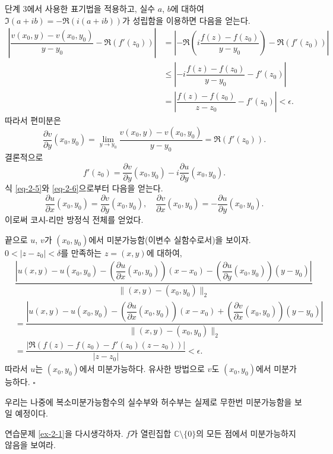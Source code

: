 단계 3에서 사용한 표기법을 적용하고,
실수 $a$, $b$에 대하여
$\Im(a+ib) = -\Re(i(a+ib))$가 성립함을 이용하면 다음을 얻는다.
\begin{align*}
\left| \dfrac{v(x_0,y) - v(x_0, y_0)}{y-y_0} - \Re(f'(z_0)) \right| 
&= \left| -\Re\left( i\dfrac{f(z)-f(z_0)}{y-y_0}\right) - \Re(f'(z_0)) \right| \\
&\le \left| -i\dfrac{f(z)-f(z_0)}{y-y_0} - f'(z_0) \right| \\
&= \left| \dfrac{f(z)-f(z_0)}{z-z_0} - f'(z_0) \right| < \epsilon .
\end{align*}
따라서 편미분은
$$
\dfrac{\partial v}{\partial y}(x_0, y_0) 
= \lim\limits_{y\to y_0} \dfrac{v(x_0,y) - v(x_0, y_0)}{y-y_0} 
= \Re(f'(z_0)).
$$
결론적으로
\begin{equation}\label{eq-2-6}
f'(z_0) = \dfrac{\partial v}{\partial y}(x_0, y_0) 
- i \dfrac{\partial u}{\partial y}(x_0, y_0).
\end{equation}
식 \eqref{eq-2-5}와 \eqref{eq-2-6}으로부터 다음을 얻는다.
$$
\dfrac{\partial u}{\partial x}(x_0, y_0) = \dfrac{\partial v}{\partial y}(x_0, y_0),
\quad
\dfrac{\partial v}{\partial x}(x_0, y_0) = - \dfrac{\partial u}{\partial y}(x_0, y_0).
$$
이로써 코시-리만 방정식 전체를 얻었다.

끝으로 $u$, $v$가 $(x_0, y_0)$에서 미분가능함(이변수 실함수로서)을 보이자.
$0<|z-z_0|<\delta$를 만족하는 $z=(x,y)$에 대하여,
\begin{align*}
& \dfrac{\left| u(x,y) - u(x_0,y_0) 
- \left( \dfrac{\partial u}{\partial x}(x_0,y_0)\right)(x - x_0)
- \left( \dfrac{\partial u}{\partial y}(x_0,y_0)\right)(y - y_0) \right|}
{\| (x,y) - (x_0,y_0)\|_2} \\
&= \dfrac{\left| u(x,y) - u(x_0,y_0) 
- \left( \dfrac{\partial u}{\partial x}(x_0,y_0)\right)(x - x_0)
+ \left( \dfrac{\partial v}{\partial x}(x_0,y_0)\right)(y - y_0) \right|}
{\| (x,y) - (x_0,y_0)\|_2} \\
&= \dfrac{|\Re(f(z) - f(z_0) - f'(z_0)(z-z_0))|}{|z-z_0|} < \epsilon.
\end{align*}
따라서 $u$는 $(x_0, y_0)$에서 미분가능하다.
유사한 방법으로 $v$도 $(x_0, y_0)$에서 미분가능하다.
\hfill $\square$

\begin{salt_remark}\label{remark-2-2}
우리는 나중에 복소미분가능함수의 실수부와 허수부는 실제로
무한번 미분가능함을 보일 예정이다.
\end{salt_remark}

\begin{salt_exercise}\label{ex-2-9}
연습문제 \ref{ex-2-1}을 다시생각하자.
$f$가 열린집합 $\mathbb C\setminus \{0\}$의 모든 점에서 미분가능하지 않음을 보여라.
\end{salt_exercise}

